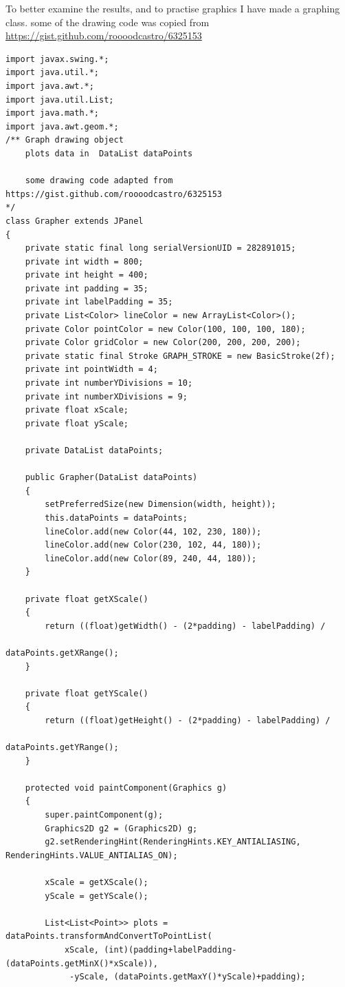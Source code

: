 \documentclass[11pt]{article} %
\begin{document}
To better examine the results, and to practise graphics I have made a graphing class. some of the drawing code was copied from  \url{https://gist.github.com/roooodcastro/6325153 } 
\begin{lstlisting}
import javax.swing.*;
import java.util.*;
import java.awt.*;
import java.util.List;
import java.math.*;
import java.awt.geom.*;
/** Graph drawing object
    plots data in  DataList dataPoints
    
    some drawing code adapted from https://gist.github.com/roooodcastro/6325153
*/
class Grapher extends JPanel
{
    private static final long serialVersionUID = 282891015;
    private int width = 800;
    private int height = 400;
    private int padding = 35;
    private int labelPadding = 35;
    private List<Color> lineColor = new ArrayList<Color>();
    private Color pointColor = new Color(100, 100, 100, 180);
    private Color gridColor = new Color(200, 200, 200, 200);
    private static final Stroke GRAPH_STROKE = new BasicStroke(2f);
    private int pointWidth = 4;
    private int numberYDivisions = 10;
    private int numberXDivisions = 9;
    private float xScale;
    private float yScale;

    private DataList dataPoints;

    public Grapher(DataList dataPoints)
    {
        setPreferredSize(new Dimension(width, height));
        this.dataPoints = dataPoints;
        lineColor.add(new Color(44, 102, 230, 180));
        lineColor.add(new Color(230, 102, 44, 180));
        lineColor.add(new Color(89, 240, 44, 180));
    }
    
    private float getXScale()
    {
        return ((float)getWidth() - (2*padding) - labelPadding) /
                                                dataPoints.getXRange();
    }
    
    private float getYScale()
    {
        return ((float)getHeight() - (2*padding) - labelPadding) /
                                                dataPoints.getYRange();
    }
    
    protected void paintComponent(Graphics g)
    {
        super.paintComponent(g);
        Graphics2D g2 = (Graphics2D) g;
        g2.setRenderingHint(RenderingHints.KEY_ANTIALIASING, RenderingHints.VALUE_ANTIALIAS_ON);

        xScale = getXScale();
        yScale = getYScale();
        
        List<List<Point>> plots = dataPoints.transformAndConvertToPointList(
            xScale, (int)(padding+labelPadding-(dataPoints.getMinX()*xScale)),
             -yScale, (dataPoints.getMaxY()*yScale)+padding);
        

\end{lstlisting}
\end{document}
